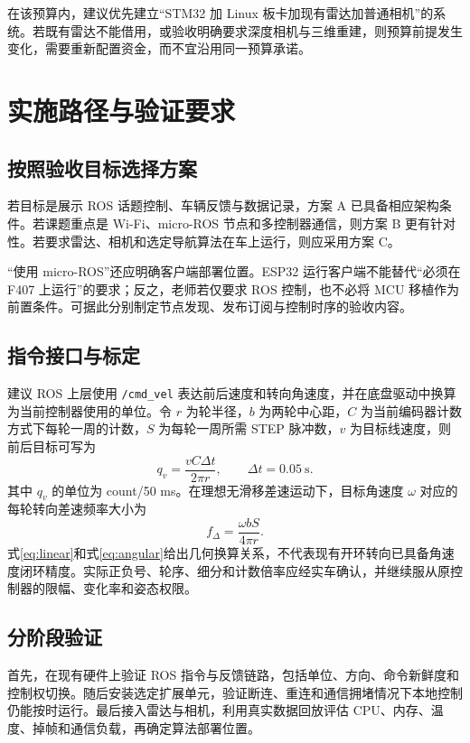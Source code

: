 \documentclass[UTF8,fontset=none,a4paper,11pt]{ctexart}
\newcommand{\code}[1]{\texttt{#1}}
\begin{document}
在该预算内，建议优先建立“STM32 加 Linux 板卡加现有雷达加普通相机”的系统。若既有雷达不能借用，或验收明确要求深度相机与三维重建，则预算前提发生变化，需要重新配置资金，而不宜沿用同一预算承诺。

\section{实施路径与验证要求}
\subsection{按照验收目标选择方案}
若目标是展示 ROS 话题控制、车辆反馈与数据记录，方案 A 已具备相应架构条件。若课题重点是 Wi-Fi、micro-ROS 节点和多控制器通信，则方案 B 更有针对性。若要求雷达、相机和选定导航算法在车上运行，则应采用方案 C。

“使用 micro-ROS”还应明确客户端部署位置。ESP32 运行客户端不能替代“必须在 F407 上运行”的要求；反之，老师若仅要求 ROS 控制，也不必将 MCU 移植作为前置条件。可据此分别制定节点发现、发布订阅与控制时序的验收内容。

\subsection{指令接口与标定}
建议 ROS 上层使用 \code{/cmd\_vel} 表达前后速度和转向角速度，并在底盘驱动中换算为当前控制器使用的单位。令 $r$ 为轮半径，$b$ 为两轮中心距，$C$ 为当前编码器计数方式下每轮一周的计数，$S$ 为每轮一周所需 STEP 脉冲数，$v$ 为目标线速度，则前后目标可写为
\begin{equation}
q_v=\frac{vC\Delta t}{2\pi r},\qquad \Delta t=0.05\ \mathrm{s}.
\label{eq:linear}
\end{equation}
其中 $q_v$ 的单位为 count/50 ms。在理想无滑移差速运动下，目标角速度 $\omega$ 对应的每轮转向差速频率大小为
\begin{equation}
f_{\Delta}=\frac{\omega bS}{4\pi r}.
\label{eq:angular}
\end{equation}
式\eqref{eq:linear}和式\eqref{eq:angular}给出几何换算关系，不代表现有开环转向已具备角速度闭环精度。实际正负号、轮序、细分和计数倍率应经实车确认，并继续服从原控制器的限幅、变化率和姿态权限。

\subsection{分阶段验证}
首先，在现有硬件上验证 ROS 指令与反馈链路，包括单位、方向、命令新鲜度和控制权切换。随后安装选定扩展单元，验证断连、重连和通信拥堵情况下本地控制仍能按时运行。最后接入雷达与相机，利用真实数据回放评估 CPU、内存、温度、掉帧和通信负载，再确定算法部署位置。
\end{document}
